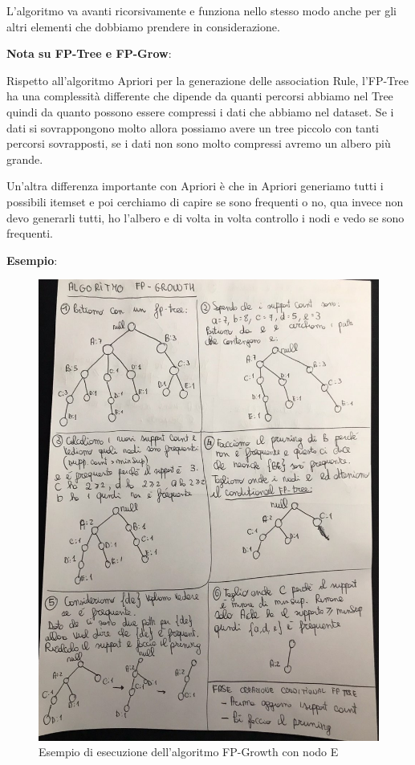 \documentclass[14pt]{extreport}
\begin{document}
L'algoritmo va avanti ricorsivamente e funziona nello stesso modo anche per gli altri elementi che dobbiamo prendere in considerazione.

\textbf{Nota su FP-Tree e FP-Grow}:

Rispetto all'algoritmo Apriori per la generazione delle association Rule, l'FP-Tree ha una complessità differente che dipende da quanti percorsi abbiamo nel Tree quindi da quanto possono essere compressi i dati che abbiamo nel dataset.
Se i dati si sovrappongono molto allora possiamo avere un tree piccolo con tanti percorsi sovrapposti, se i dati non sono molto compressi avremo un albero più grande.

Un'altra differenza importante con Apriori è che in Apriori generiamo tutti i possibili itemset e poi cerchiamo di capire se sono frequenti o no, qua invece non devo generarli tutti, ho l'albero e di volta in volta controllo i nodi e vedo se sono frequenti.


\textbf{Esempio}:
\begin{figure}[h!]
  \includegraphics[width=\linewidth]{FPGrowth1.png}
  \caption{Esempio di esecuzione dell'algoritmo FP-Growth con nodo E}
\end{figure}
\end{document}
